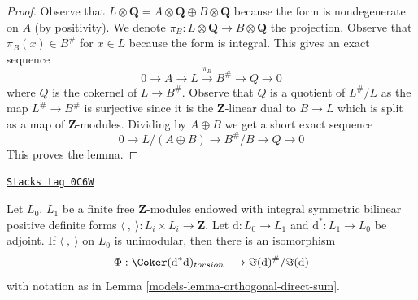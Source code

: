 \begin{proof}
Observe that
$L \otimes \mathbf{Q} = A \otimes \mathbf{Q} \oplus B \otimes \mathbf{Q}$
because the form is nondegenerate on $A$ (by positivity).
We denote $\pi_B : L \otimes \mathbf{Q} \to B \otimes \mathbf{Q}$
the projection. Observe that $\pi_B(x) \in B^\#$ for $x \in L$
because the form is integral. This gives an exact sequence
$$
0 \to A \to L \xrightarrow{\pi_B} B^\# \to Q \to 0
$$
where $Q$ is the cokernel of $L \to B^\#$. Observe that $Q$
is a quotient of $L^\#/L$ as the map $L^\# \to B^\#$ is surjective
since it is the $\mathbf{Z}$-linear dual to $B \to L$ which is split
as a map of $\mathbf{Z}$-modules.
Dividing by $A \oplus B$ we get a short exact sequence
$$
0 \to L/(A \oplus B) \to B^\#/B \to Q \to 0
$$
This proves the lemma.
\end{proof}

\begin{lemma}[Coker]
\label{models-lemma-coker}
\href{https://stacks.math.columbia.edu/tag/0C6W}{\texttt{Stacks tag 0C6W}}

Let $L_0$, $L_1$ be a finite free $\mathbf{Z}$-modules endowed
with integral symmetric bilinear positive definite
forms $\langle\ ,\ \rangle : L_i \times L_i \to \mathbf{Z}$.
Let $\text{d} : L_0 \to L_1$ and $\text{d}^* : L_1 \to L_0$
be adjoint. If $\langle\ ,\ \rangle$ on $L_0$ is unimodular, then
there is an isomorphism
$$
\Phi :
\Coker(\text{d}^*\text{d})_{torsion}
\longrightarrow
\Im(\text{d})^\#/\Im(\text{d})
$$
with notation as in Lemma \ref{models-lemma-orthogonal-direct-sum}.
\end{lemma}

